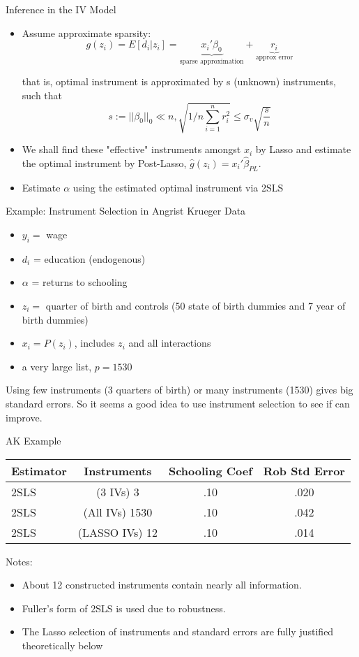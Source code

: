 \documentclass{beamer}
\begin{document}
\begin{frame}{Inference in the IV Model}
	\begin{itemize}
		\item Assume approximate sparsity:
		\[ g(z_i) = E[d_i|z_i]= \underbrace{x_i'\beta_0}_{\text{sparse approximation}} + \underbrace{r_i}_{\text{approx error}} \]
		
		that is, optimal instrument is approximated by s (unknown) instruments, such that
		\[ s:= ||\beta_0||_0 \ll n, \sqrt{1/n \sum_{i=1}^n r_i^2} \leq \sigma_v \sqrt{\frac{s}{n}} \]
		\item We shall find these "effective" instruments amongst $x_i$ by Lasso and estimate the optimal instrument by Post-Lasso, $\hat{g}(z_i)=x_i' \hat{\beta}_{PL}$.
		\item Estimate $\alpha$ using the estimated optimal instrument via 2SLS
	\end{itemize}
\end{frame}

\begin{frame}{Example: Instrument Selection in Angrist Krueger Data}
	\begin{itemize}
		\item $y_i =$ wage
\item $d_i$ = education (endogenous)
\item $\alpha$ = returns to schooling
\item $z_i=$ quarter of birth and controls (50 state of birth dummies and 7
year of birth dummies)
\item $x_i = P(z_i)$, includes $z_i$ and all interactions
\item a very large list, $p = 1530$
	\end{itemize}
	Using few instruments (3 quarters of birth) or many instruments
(1530) gives big standard errors. So it seems a good idea to use
instrument selection to see if can improve.
\end{frame}

\begin{frame}{AK Example}
	
	\begin{tabular}{lccc}
	\hline \hline
	Estimator & Instruments & Schooling Coef & Rob Std Error\\ \hline
2SLS &(3 IVs) 3 &.10 &.020\\ \hline
2SLS &(All IVs) 1530& .10& .042\\ \hline
2SLS &(LASSO IVs) 12& .10& .014\\ \hline \hline
	\end{tabular}
	
	Notes:
	\begin{itemize}
		\item About 12 constructed instruments contain nearly all information.
\item Fuller's form of 2SLS is used due to robustness.
\item The Lasso selection of instruments and standard errors are fully
justified theoretically below
	\end{itemize}
\end{frame}
\end{document}
